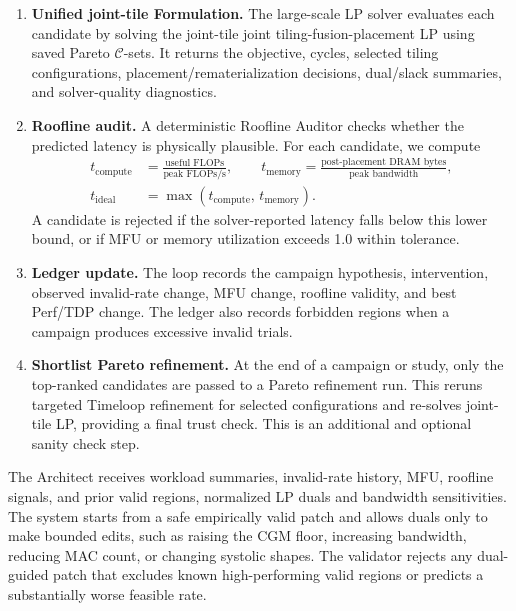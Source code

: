 \begin{enumerate}
\item \textbf{Unified joint-tile Formulation.} The large-scale LP solver evaluates each candidate by solving the joint-tile joint tiling-fusion-placement LP using saved Pareto $\mathcal{C}$-sets.
It returns the objective, cycles, selected tiling configurations, placement/rematerialization decisions, dual/slack summaries, and solver-quality diagnostics.

\item \textbf{Roofline audit.} A deterministic Roofline Auditor checks whether the predicted latency is physically plausible.
For each candidate,
we compute
\begin{align}
    t_{\text{compute}} &= \frac{\text{useful FLOPs}}{\text{peak FLOPs/s}},
    \qquad
    t_{\text{memory}}  = \frac{\text{post-placement DRAM bytes}}{\text{peak bandwidth}},
    \nonumber\\
    t_{\text{ideal}}   &= \max\!\left(t_{\text{compute}},\, t_{\text{memory}}\right).
\end{align}
A candidate is rejected if the solver-reported latency falls below this lower bound, or if MFU or memory utilization exceeds 1.0 within tolerance.

\item \textbf{Ledger update.} The loop records the campaign hypothesis, intervention, observed invalid-rate change, MFU change, roofline validity, and best Perf/TDP change.
The ledger also records forbidden regions when a campaign produces excessive invalid trials.

\item \textbf{Shortlist Pareto refinement.} At the end of a campaign or study, only the top-ranked candidates are passed to a Pareto refinement run.
This reruns targeted Timeloop refinement
for selected configurations and re-solves joint-tile LP, providing a final trust check.
This is an additional and optional sanity check step.

\end{enumerate}

The Architect receives workload summaries, invalid-rate history, MFU, roofline signals, and prior valid regions, normalized LP duals and bandwidth sensitivities.
The system starts from a safe empirically valid patch and allows duals only to make bounded edits, such as raising the CGM floor, increasing bandwidth, reducing MAC count, or changing systolic shapes.
The validator rejects any dual-guided patch that excludes known high-performing valid regions or predicts a substantially worse feasible rate.


